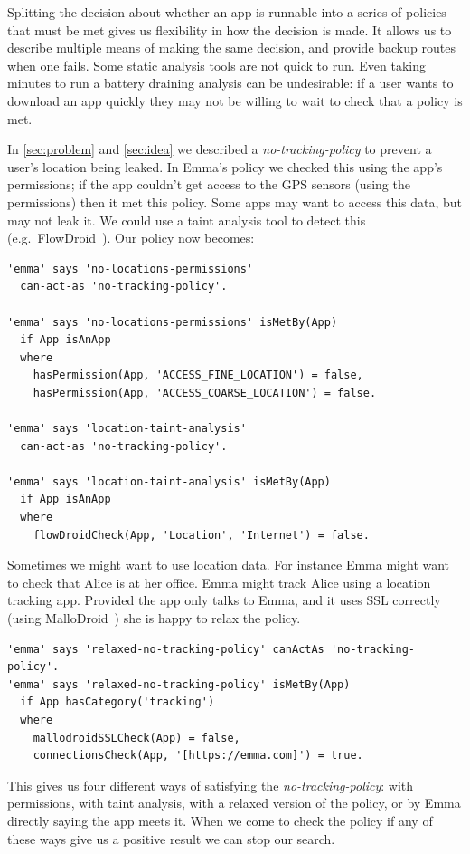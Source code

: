 \documentclass[]{llncs}
\begin{document}
Splitting the decision about whether an app is runnable into a series of policies that must be met gives us flexibility in how the decision is made.
It allows us to describe multiple means of making the same decision, and provide backup routes when one fails.
Some static analysis tools are not quick to run.
Even taking minutes to run a battery draining analysis can be undesirable:
if a user wants to download an app quickly they may not be willing to wait to check that a policy is met.

In \autoref{sec:problem} and \autoref{sec:idea} we described a \emph{no-tracking-policy} to prevent a user's location being leaked.
In Emma's policy we checked this using the app's permissions;
if the app couldn't get access to the GPS sensors (using the permissions) then it met this policy.
Some apps may want to access this data, but may not leak it.
We could use a taint analysis tool to detect this (e.g.~FlowDroid~\cite{Arzt:2014kf,Li:2015wo}).
Our policy now becomes:

\begin{lstlisting}
'emma' says 'no-locations-permissions'
  can-act-as 'no-tracking-policy'.

'emma' says 'no-locations-permissions' isMetBy(App)
  if App isAnApp
  where
    hasPermission(App, 'ACCESS_FINE_LOCATION') = false,
    hasPermission(App, 'ACCESS_COARSE_LOCATION') = false.

'emma' says 'location-taint-analysis'
  can-act-as 'no-tracking-policy'.

'emma' says 'location-taint-analysis' isMetBy(App)
  if App isAnApp
  where
    flowDroidCheck(App, 'Location', 'Internet') = false.
\end{lstlisting}

Sometimes we might want to use location data.
For instance Emma might want to check that Alice is at her office.
Emma might track Alice using a location tracking app.
Provided the app only talks to Emma, and it uses SSL correctly (using MalloDroid~\cite{Fahl:2012dj}) she is happy to relax the policy.

\begin{lstlisting}
'emma' says 'relaxed-no-tracking-policy' canActAs 'no-tracking-policy'.
'emma' says 'relaxed-no-tracking-policy' isMetBy(App)
  if App hasCategory('tracking')
  where
    mallodroidSSLCheck(App) = false,
    connectionsCheck(App, '[https://emma.com]') = true.
\end{lstlisting}

This gives us four different ways of satisfying the \emph{no-tracking-policy}:
  with permissions,
  with taint analysis,
  with a relaxed version of the policy,
  or by Emma directly saying the app meets it.
When we come to check the policy if any of these ways give us a positive result we can stop our search.
\end{document}

